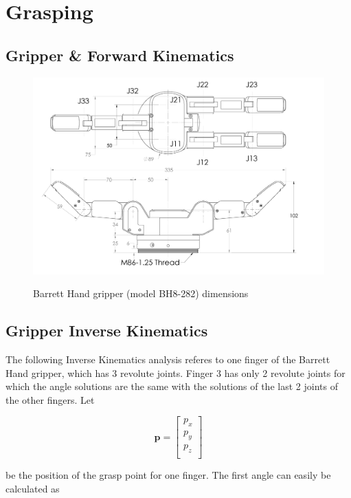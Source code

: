 \section{Grasping}

\subsection{Gripper \& Forward Kinematics}

\begin{center}
\begin{figure}[H]
\centering
\includegraphics[width=12cm]{images/bh8-282-dimensions.png}\\
\caption{Barrett Hand gripper (model BH8-282) dimensions}
\end{figure}
\end{center}


\subsection{Gripper Inverse Kinematics}

The following Inverse Kinematics analysis referes to one finger of the Barrett Hand gripper, which has 3 revolute joints. Finger 3 has only 2 
revolute joints for which the angle solutions are the same with the solutions of the last 2 joints of the other fingers. Let

\[
\mathbf{p} = \begin{bmatrix} p_x \\ p_y \\ p_z \\ \end{bmatrix}
\]

be the position of the grasp point for one finger. The first angle can easily be calculated as

